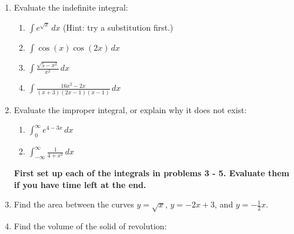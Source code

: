 \documentclass[12pt]{article}
\newcommand{\di}{\displaystyle}
\begin{document}
\newpage





 \begin{enumerate}
\item Evaluate the indefinite integral:
\begin{enumerate}

 \item $\di \int e^{\sqrt{x}}\,dx$ (Hint: try a substitution first.)

\vspace{1.5in}

 \item $\di \int \cos(x)\cos(2x)\,dx$

\vspace{1.5in}


 \item $\di \int \frac{\sqrt{5-x^2}}{x^2}\,dx$

\vspace{2in}

 \item $\di \int \frac{16x^2-2x}{(x+3)(2x-1)(x-1)}\,dx$

\end{enumerate}



\newpage
  \item Evaluate the improper integral, or explain why it does not exist:
  \begin{multicols}{2}
\begin{enumerate}
 \item $\di \int_0^\infty e^{4-3x}\,dx$
 

 
 \item $\di \int_{-\infty}^\infty \frac{1}{4+x^2}\,dx$
\end{enumerate}
\end{multicols}

\vspace{3.5in}


\textbf{First set up each of the integrals in problems 3 - 5. Evaluate them if you have time left at the end.}

 \item Find the area between the  curves
$y=\sqrt{x}$, $y=-2x+3$, and $y=-\frac{1}{2}x$.
 
 \newpage


\item Find the volume of the solid of revolution:
\begin{enumerate}
 

\end{enumerate}
\end{enumerate}
\end{document}
